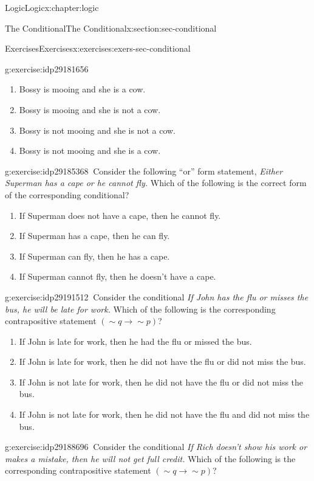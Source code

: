 \documentclass[twoside,10pt,]{book}
\numberwithin{equation}{section}
\newcommand{\contrapositive}{{\sim\!{q}{} {\rightarrow} \sim\!{p}{}}}
\begin{document}
\begin{chapterptx}{Logic}{}{Logic}{}{}{x:chapter:logic}
\begin{sectionptx}{The Conditional}{}{The Conditional}{}{}{x:section:sec-conditional}
\begin{exercises-subsection}{Exercises}{}{Exercises}{}{}{x:exercises:exers-sec-conditional}
\begin{divisionexercise}{31}{}{}{g:exercise:idp29181656}
\begin{enumerate}[label=(\alph*)]
\item{}Bossy is mooing and she is a cow.%
\item{}Bossy is mooing and she is not a cow.%
\item{}Bossy is not mooing and she is not a cow.%
\item{}Bossy is not mooing and she is a cow.%
\end{enumerate}
\end{divisionexercise}%
\begin{divisionexercise}{32}{}{}{g:exercise:idp29185368}%
\(\ \)Consider the following ``or'' form statement, \emph{Either Superman has a cape or he cannot fly.}  Which of the following is the correct form of the corresponding conditional? %
\begin{enumerate}[label=(\alph*)]
\item{}If Superman does not have a cape, then he cannot fly.%
\item{}If Superman has a cape, then he can fly.%
\item{}If Superman can fly, then he has a cape.%
\item{}If Superman cannot fly, then he doesn't have a cape.%
\end{enumerate}
\end{divisionexercise}%
\begin{divisionexercise}{33}{}{}{g:exercise:idp29191512}%
\(\ \)Consider the conditional \emph{If John has the flu or misses the bus, he will be late for work.}  Which of the following is the corresponding contrapositive statement \((\contrapositive)\)? %
\begin{enumerate}[label=(\alph*)]
\item{}If John is late for work, then he had the flu or missed the bus.%
\item{}If John is late for work, then he did not have the flu or did not miss the bus.%
\item{}If John is not late for work, then he did not have the flu or did not miss the bus.%
\item{}If John is not late for work, then he did not have the flu and did not miss the bus.%
\end{enumerate}
\end{divisionexercise}%
\begin{divisionexercise}{34}{}{}{g:exercise:idp29188696}%
\(\ \)Consider the conditional \emph{If Rich doesn't show his work or makes a mistake, then he will not get full credit.}  Which of the following is the corresponding contrapositive statement \((\contrapositive)\)? %

\end{divisionexercise}
\end{exercises-subsection}
\end{sectionptx}
\end{chapterptx}
\end{document}
